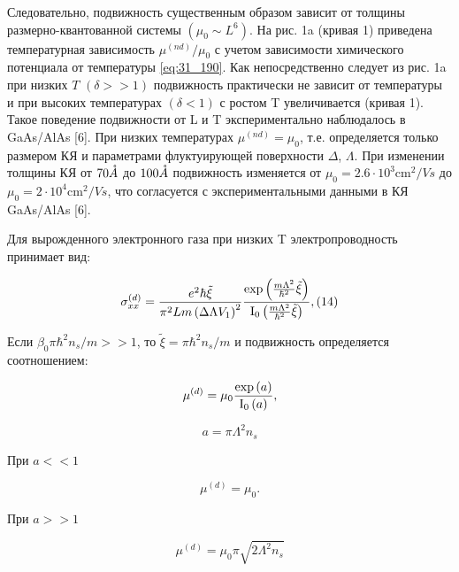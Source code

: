 Следовательно, подвижность существенным образом зависит от толщины размерно-квантованной системы $(\mu _{0} \sim L^{6} )$. На рис. 1a (кривая 1) приведена температурная зависимость $\mu ^{(nd)} /\mu _{0} $ с учетом зависимости химического потенциала от температуры \eqref{eq:31_190}. Как непосредственно следует из рис. 1a при низких $T$ $(\delta >>1)$ подвижность практически не зависит от температуры и при высоких температурах $(\delta <1)$ с ростом T увеличивается (кривая 1). Такое поведение подвижности от L и T экспериментально наблюдалось в GaAs/AlAs \cite{Sakaki1987}[6]. При низких температурах $\mu ^{(nd)} =\mu _{0} $, т.е. определяется только размером КЯ и параметрами флуктуирующей поверхности $\Delta $, $\Lambda $. При изменении толщины КЯ от $70 \AA$ до $100 \AA$ подвижность изменяется от $\mu _{0} =2.6\cdot 10^{3} \text{cm}^{2} /{Vs}$ до $\mu _{0} =2\cdot 10^{4} \text{cm}^{2} /{Vs}$, что согласуется с экспериментальными данными в КЯ GaAs/AlAs \cite{Sakaki1987}[6].

Для вырожденного электронного газа при низких T электропроводность принимает вид:

\begin{equation} \label{eq:31_210}
\sigma _{xx}^{(d)} =\frac{e^{2} \hbar \tilde{\xi }}{\pi ^{2} Lm\left(\Delta \Lambda V_{1} \right)^{2} } \frac{{\rm exp}\left(\frac{m\Lambda ^{2} }{\hbar ^{2} } \tilde{\xi }\right)}{{\rm I}_{{\rm 0}} \left(\frac{m\Lambda ^{2} }{\hbar ^{2} } \tilde{\xi }\right)} ,    (14)
\end{equation}


Если $\beta _{0} \pi \hbar ^{2} n_{s} /m>>1$, то $\tilde{\xi }=\pi \hbar ^{2} n_{s} /m$ и подвижность определяется соотношением:

\begin{equation} \label{eq:31_220}
\mu ^{(d)} =\mu _{0} \frac{{\rm exp}\left(a\right)}{{\rm I}_{{\rm 0}} \left(a\right)},
\end{equation}

\[
a=\pi \Lambda ^{2} n_{s}
\]

При $a<<1$ 

\begin{equation} \label{eq:31_230}     
\mu ^{(d)} =\mu _{0}.
\end{equation}

При $a>>1$

\begin{equation} \label{eq:31_240}  
\mu ^{(d)} =\mu _{0} \pi \sqrt{2\Lambda ^{2} n_{s} }
\end{equation}

